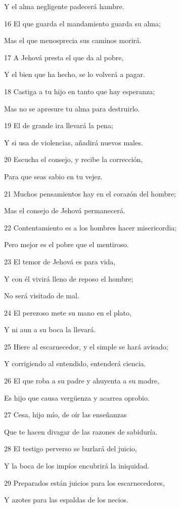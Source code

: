 \par Y el alma negligente padecerá hambre.
\par 16 El que guarda el mandamiento guarda su alma;
\par Mas el que menosprecia sus caminos morirá.
\par 17 A Jehová presta el que da al pobre,
\par Y el bien que ha hecho, se lo volverá a pagar.
\par 18 Castiga a tu hijo en tanto que hay esperanza; 
\par Mas no se apresure tu alma para destruirlo.
\par 19 El de grande ira llevará la pena;
\par Y si usa de violencias, añadirá nuevos males.
\par 20 Escucha el consejo, y recibe la corrección,
\par Para que seas sabio en tu vejez. 
\par 21 Muchos pensamientos hay en el corazón del hombre;
\par Mas el consejo de Jehová permanecerá. 
\par 22 Contentamiento es a los hombres hacer misericordia;
\par Pero mejor es el pobre que el mentiroso.
\par 23 El temor de Jehová es para vida,
\par Y con él vivirá lleno de reposo el hombre;
\par No será visitado de mal.
\par 24 El perezoso mete su mano en el plato,
\par Y ni aun a su boca la llevará.
\par 25 Hiere al escarnecedor, y el simple se hará avisado;
\par Y corrigiendo al entendido, entenderá ciencia.
\par 26 El que roba a su padre y ahuyenta a su madre,
\par Es hijo que causa vergüenza y acarrea oprobio.
\par 27 Cesa, hijo mío, de oír las enseñanzas
\par Que te hacen divagar de las razones de sabiduría.
\par 28 El testigo perverso se burlará del juicio,
\par Y la boca de los impíos encubrirá la iniquidad.
\par 29 Preparados están juicios para los escarnecedores,
\par Y azotes para las espaldas de los necios.


